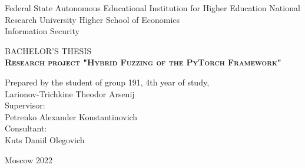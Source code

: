 \begin{titlepage}
    \newpage

    {
        \begin{center}
            Federal State Autonomous Educational Institution for Higher Education
            National Research University Higher School of Economics
            \\
            \bigskip
            Information Security \\
        \end{center}
    }

    \vspace{8em}

    \begin{center}
        {\Large BACHELOR'S THESIS}\\
        \textsc{\textbf{
                Research project
                \linebreak
                "Hybrid Fuzzing of the PyTorch Framework"}}
    \end{center}

    \vspace{4em}

    {
        \hfill\parbox{16cm}{
            \hspace*{5cm}\hspace*{-5cm}Prepared by the student of group 191, 4th year of study,\\
            Larionov-Trichkine Theodor Arsenij\\

            \hspace*{5cm}\hspace*{-5cm}Supervisor:\\
            Petrenko Alexander Konstantinovich
            \\

            \hspace*{5cm}\hspace*{-5cm}Consultant:\\
            Kuts Daniil Olegovich
            \\
        }
    }

    \vspace{\fill}

    \begin{center}
        Moscow 2022
    \end{center}

\end{titlepage}
